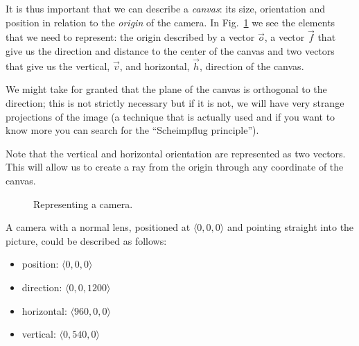 \documentclass[a4paper,11pt]{article}
\begin{document}
It is thus important that we can describe a {\em canvas}: its size,
orientation and position in relation to the {\em origin} of the
camera. In Fig.~\ref{fig:camera} we see the elements that we need to
represent: the origin described by a vector $\vec{o}$,
a vector $\vec{f}$
that give us the direction and distance to the center of the canvas
and two vectors that give us the vertical, $\vec{v}$,
and horizontal, $\vec{h}$,
direction of the canvas. 

We might take for granted that the plane of the canvas is orthogonal to
the direction; this is not strictly necessary but if it is not, we will
have very strange projections of the image (a technique that is
actually used and if you want to know more you can search for the
``Scheimpflug principle'').

Note that the vertical and horizontal orientation are represented as
two vectors. This will allow us to create a ray from the origin through
any coordinate of the canvas. 

\begin{figure}[h!]
\begin{center}
\caption{Representing a camera.}
\label{fig:camera}
\end{center}
\end{figure}

A camera with a normal lens, positioned at $\langle 0,0,0\rangle$
and pointing straight into the picture, could be described as follows:

\begin{itemize}
 \item position: $\langle 0,0,0\rangle$
 \item direction: $\langle 0,0,1200\rangle$
 \item horizontal: $\langle 960,0,0\rangle$
 \item vertical: $\langle 0,540,0\rangle$
\end{itemize}
\end{document}
